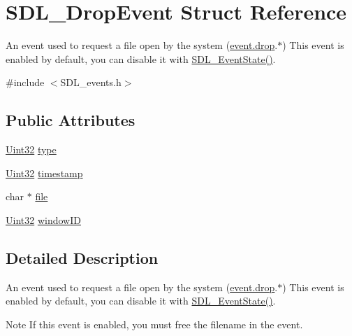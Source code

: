 \hypertarget{struct_s_d_l___drop_event}{\section{S\-D\-L\-\_\-\-Drop\-Event Struct Reference}
\label{struct_s_d_l___drop_event}
}


An event used to request a file open by the system (\hyperlink{union_s_d_l___event_acff77bccbca65abbb876360a3f5209c9}{event.\-drop}.$\ast$) This event is enabled by default, you can disable it with \hyperlink{_s_d_l__events_8h_afb772893e1c46f186fa39a4defe76df3}{S\-D\-L\-\_\-\-Event\-State()}.  




{\ttfamily \#include $<$S\-D\-L\-\_\-events.\-h$>$}

\subsection*{Public Attributes}
\begin{DoxyCompactItemize}
\item 
\hyperlink{_s_d_l__stdinc_8h_add440eff171ea5f55cb00c4a9ab8672d}{Uint32} \hyperlink{struct_s_d_l___drop_event_a5ea27cfaa5f8d4940e9a69b68b3cc035}{type}
\item 
\hyperlink{_s_d_l__stdinc_8h_add440eff171ea5f55cb00c4a9ab8672d}{Uint32} \hyperlink{struct_s_d_l___drop_event_a02d2c81bb22db632a40cd0021ff751ab}{timestamp}
\item 
char $\ast$ \hyperlink{struct_s_d_l___drop_event_abc41ef4beb62e1d8b56827128b29585f}{file}
\item 
\hyperlink{_s_d_l__stdinc_8h_add440eff171ea5f55cb00c4a9ab8672d}{Uint32} \hyperlink{struct_s_d_l___drop_event_a8cecd2178cdc04118bf852e7cf7bf647}{window\-I\-D}
\end{DoxyCompactItemize}


\subsection{Detailed Description}
An event used to request a file open by the system (\hyperlink{union_s_d_l___event_acff77bccbca65abbb876360a3f5209c9}{event.\-drop}.$\ast$) This event is enabled by default, you can disable it with \hyperlink{_s_d_l__events_8h_afb772893e1c46f186fa39a4defe76df3}{S\-D\-L\-\_\-\-Event\-State()}. 

\begin{DoxyNote}{Note}
If this event is enabled, you must free the filename in the event. 
\end{DoxyNote}


